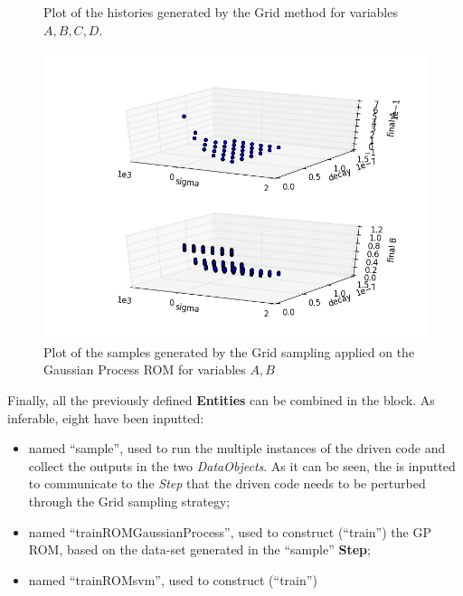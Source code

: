 \begin{enumerate}
\begin{figure}[h!]
  \caption{Plot of the histories generated by the Grid method for variables $A,B,C,D$.}
  \label{fig:ROMgrid_histories}
 \end{figure}
 \begin{figure}[h!]
  \centering
  \includegraphics[scale=0.7]{pics/samplesPlot3DROMgp_scatter-scatter.png}
  \caption{Plot of the samples generated by the Grid sampling applied on the Gaussian Process ROM for variables $A,B$}
  \label{fig:ROMgp_samples}
 \end{figure}
   Finally, all the previously defined \textbf{Entities} can be combined in 
   the  block. As inferable, 
   eight  have been inputted:
   \begin{itemize}
     \item {} named ``sample'', used to run the multiple  
     instances of the driven code and 
     collect the outputs in the two \textit{DataObjects}. As it can be
     seen, the  is inputted to communicate to the 
     \textit{Step} that the driven code needs to
     be perturbed through the Grid sampling strategy;
     \item {} named ``trainROMGaussianProcess'', used to construct (``train'')
     the GP ROM, based on the data-set generated in the  ``sample'' \textbf{Step};
     \item {} named ``trainROMsvm'', used to construct (``train'')

\end{itemize}
\end{enumerate}

